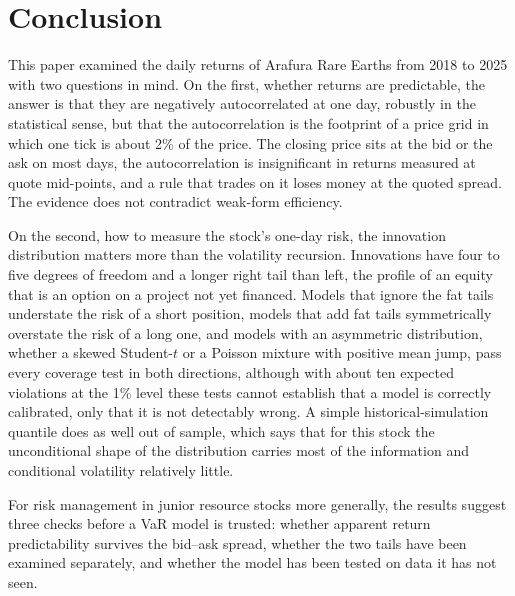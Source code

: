 \documentclass[11pt,a4paper]{article}
\begin{document}
\section{Conclusion}\label{sec:concl}

This paper examined the daily returns of Arafura Rare Earths from 2018 to 2025 with two questions in mind. On the first, whether returns are predictable, the answer is that they are negatively autocorrelated at one day, robustly in the statistical sense, but that the autocorrelation is the footprint of a price grid in which one tick is about 2\% of the price. The closing price sits at the bid or the ask on most days, the autocorrelation is insignificant in returns measured at quote mid-points, and a rule that trades on it loses money at the quoted spread. The evidence does not contradict weak-form efficiency.

On the second, how to measure the stock's one-day risk, the innovation distribution matters more than the volatility recursion. Innovations have four to five degrees of freedom and a longer right tail than left, the profile of an equity that is an option on a project not yet financed. Models that ignore the fat tails understate the risk of a short position, models that add fat tails symmetrically overstate the risk of a long one, and models with an asymmetric distribution, whether a skewed Student-$t$ or a Poisson mixture with positive mean jump, pass every coverage test in both directions, although with about ten expected violations at the 1\% level these tests cannot establish that a model is correctly calibrated, only that it is not detectably wrong. A simple historical-simulation quantile does as well out of sample, which says that for this stock the unconditional shape of the distribution carries most of the information and conditional volatility relatively little.

For risk management in junior resource stocks more generally, the results suggest three checks before a VaR model is trusted: whether apparent return predictability survives the bid--ask spread, whether the two tails have been examined separately, and whether the model has been tested on data it has not seen.

\clearpage
{}




\clearpage
\end{document}
